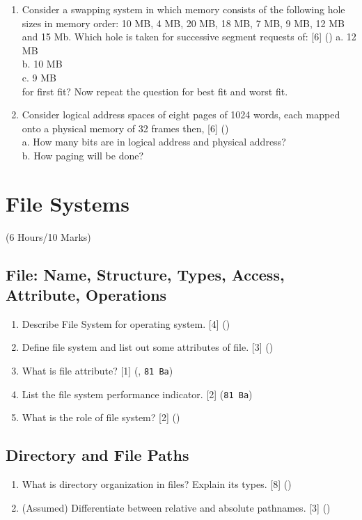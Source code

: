 \documentclass[12pt]{article}
\begin{document}
\begin{enumerate}
			\item Consider a swapping system in which memory consists of the following hole sizes in memory order: 10 MB, 4 MB, 20 MB, 18 MB, 7 MB, 9 MB, 12 MB and 15 Mb. Which hole is taken for successive segment requests of: \hfill [6] ()
			a. 12 MB\\
			b. 10 MB\\
			c. 9 MB\\
			for first fit? Now repeat the question for best fit and worst fit.

			\item Consider logical address spaces of eight pages of 1024 words, each mapped onto a physical memory of 32 frames then, \hfill [6] ()\\
			a. How many bits are in logical address and physical address?\\
			b. How paging will be done?
		\end{enumerate}

	\pagebreak

\section{File Systems}
	\begin{center}(6 Hours/10 Marks)\end{center}
	\subsection{File: Name, Structure, Types, Access, Attribute, Operations}
		\begin{enumerate}
			\item Describe File System for operating system. \hfill [4] ()

			\item Define file system and list out some attributes of file. \hfill [3] ()

			\item What is file attribute? \hfill [1] (, \texttt{81 Ba})

			\item List the file system performance indicator. \hfill [2] (\texttt{81 Ba})

			\item What is the role of file system? \hfill [2] ()
		\end{enumerate}
	\subsection{Directory and File Paths}
		\begin{enumerate}
			\item What is directory organization in files? Explain its types. \hfill [8] ()

			\item (Assumed) Differentiate between relative and absolute pathnames. \hfill [3] ()
		\end{enumerate}
\end{document}
